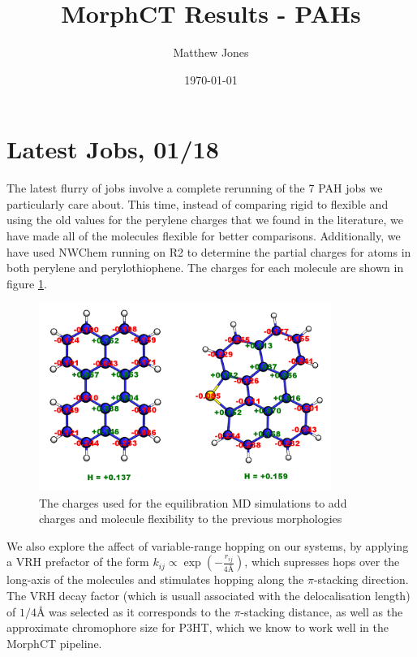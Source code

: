 \documentclass[12pt]{article}
\title{MorphCT Results - PAHs}
\author{Matthew Jones}
\date{\today}
\begin{document}
\maketitle


\section{Latest Jobs, 01/18}


The latest flurry of jobs involve a complete rerunning of the 7 PAH jobs we particularly care about.
This time, instead of comparing rigid to flexible and using the old values for the perylene charges that we found in the literature, we have made all of the molecules flexible for better comparisons.
Additionally, we have used NWChem running on R2 to determine the partial charges for atoms in both perylene and perylothiophene.
The charges for each molecule are shown in figure \ref{fig:charges}.


\begin{figure}[h]\centering
	\includegraphics[width=0.85\textwidth]{Figures/chargedPAH.png}
    \caption{The charges used for the equilibration MD simulations to add charges and molecule flexibility to the previous morphologies}
	\label{fig:charges}
\end{figure}


We also explore the affect of variable-range hopping on our systems, by applying a VRH prefactor of the form $k_{ij} \propto \exp \left( - \frac{r_{ij}}{4 \text{\AA}} \right)$, which supresses hops over the long-axis of the molecules and stimulates hopping along the $\pi$-stacking direction.
The VRH decay factor (which is usuall associated with the delocalisation length) of $1 / 4 \text{\AA}$ was selected as it corresponds to the $\pi$-stacking distance, as well as the approximate chromophore size for P3HT, which we know to work well in the MorphCT pipeline.
\end{document}
